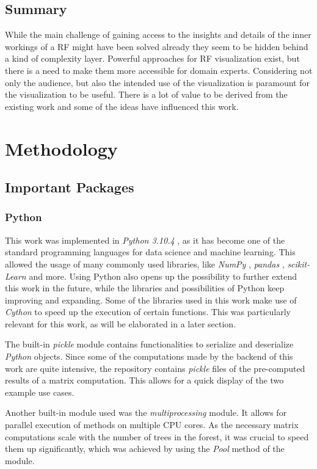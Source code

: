 \documentclass[a4paper, 12pt]{article}
\begin{document}
\subsection{Summary}
While the main challenge of gaining access to the insights and details of the inner workings
of a RF might have been solved already they seem to be hidden behind a kind of complexity
layer. Powerful approaches for RF visualization exist, but there is a need to make them more
accessible for domain experts. Considering not only the audience, but also the intended
use of the visualization is paramount for the visualization to be useful. There is a lot
of value to be derived from the existing work and some of the ideas have influenced this
work.

\section{Methodology}
\subsection {Important Packages}
\subsubsection{Python}
This work was implemented in \textit{Python 3.10.4} \cite{10.5555/1593511}, as it has
become one of the standard programming languages for data science and machine learning.
This allowed the usage of many commonly used libraries, like \textit{NumPy} \cite{harris2020array},
\textit{pandas} \cite{mckinney-proc-scipy-2010}, \textit{scikit-Learn} \cite{scikit-learn} and more.
Using Python also opens up the possibility to further extend this work in the future, while
the libraries and possibilities of Python keep improving and expanding.
Some of the libraries used in this work make use of \textit{Cython} \cite{behnel2011cython} to
speed up the execution of certain functions. This was particularly relevant for this work, as will
be elaborated in a later section. \par
The built-in \textit{pickle} module contains functionalities to serialize and deserialize
\textit{Python} objects.
Since some of the computations made by the backend of this work are quite intensive, the repository
contains \textit{pickle} files of the pre-computed results of a matrix computation. This allows
for a quick display of the two example use cases. \par
Another built-in module used was the \textit{multiprocessing} module. It allows for parallel
execution of methods on multiple CPU cores. As the necessary matrix computations scale with the
number of trees in the forest, it was crucial to speed them up significantly, which was achieved
by using the \textit{Pool} method of the module.
\end{document}
